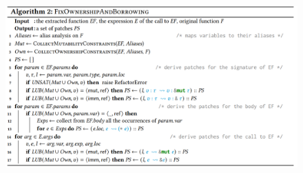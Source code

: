 

\begin{figure}[h!]
    \centering
    \includegraphics[width=\textwidth]{figures/algo_2.png}
    \label{fig:algo_2}
\end{figure}

